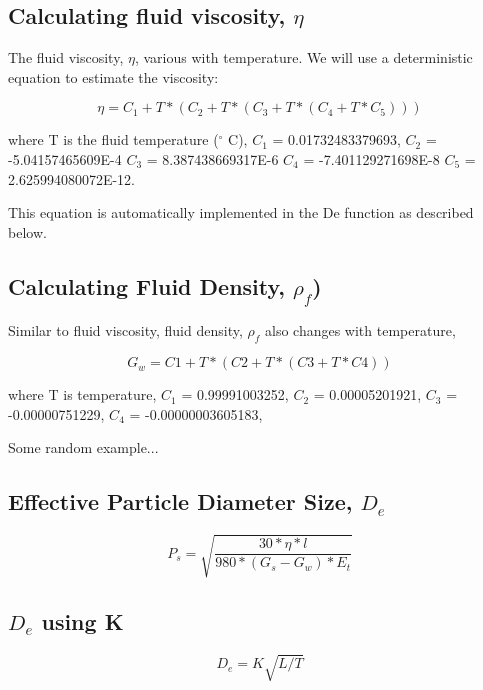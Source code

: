 \subsection{Calculating fluid viscosity, $\eta$}

The fluid viscosity, $\eta$, various with temperature. We will use a deterministic equation to estimate the viscosity:

\begin{equation}
\eta = C_1 + T * (C_2 + T * (C_3 + T *  (C_4 + T * C_5)))
\end{equation}

where T is the fluid temperature ($^\circ$ C),
$C_1$ = 0.01732483379693,
$C_2$ = -5.04157465609E-4
$C_3$ = 8.387438669317E-6
$C_4$ = -7.401129271698E-8
$C_5$ = 2.625994080072E-12.

This equation is automatically implemented in the De function as described below. 

\subsection{Calculating Fluid Density, $\rho_f$)}

Similar to fluid viscosity, fluid density, $\rho_f$ also changes with temperature,

\begin{equation}
G_w = C1 + T * (C2 + T * (C3 + T * C4))
\end{equation}

where T is temperature, 
$C_1$ = 0.99991003252,
$C_2$ = 0.00005201921, 
$C_3$ = -0.00000751229, 
$C_4$ = -0.00000003605183,




Some random example...


\subsection{Effective Particle Diameter Size, $D_e$}

\begin{equation}
P_s = \sqrt{\frac{30*\eta*l}{980*(G_s - G_w)*E_t}}
\end{equation}

\newpage
\subsection{$D_e$ using K}

\begin{equation}
D_e = K \sqrt{L/T}
\end{equation}


